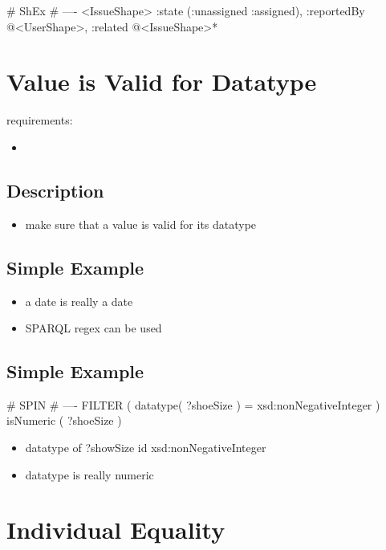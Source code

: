 \documentclass{llncs}
\begin{document}
\begin{ex}
# ShEx
# ----
<IssueShape> {
    :state (:unassigned :assigned),
    :reportedBy @<UserShape>,
    :related @<IssueShape>*
}
\end{ex}

\section{Value is Valid for Datatype}

requirements:

\begin{itemize}
	\item 
\end{itemize}

\subsection{Description}

\begin{itemize}
	\item make sure that a value is valid for its datatype
\end{itemize}

\subsection{Simple Example}

\begin{itemize}
	\item a date is really a date
  \item SPARQL regex can be used
\end{itemize}

\subsection{Simple Example}

\begin{ex}
# SPIN
# ----
FILTER ( datatype( ?shoeSize ) = xsd:nonNegativeInteger )
isNumeric ( ?shoeSize )
\end{ex}

\begin{itemize}
	\item datatype of ?showSize id xsd:nonNegativeInteger
	\item datatype is really numeric
\end{itemize}

\section{Individual Equality}
\end{document}

